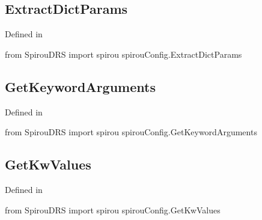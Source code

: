 \begin{minipage}{\textwidth}
\subsection{ExtractDictParams}

Defined in \spirou {}

\begin{pythonbox}
from SpirouDRS import spirou
spirouConfig.ExtractDictParams

\end{pythonbox}

\begin{pythondocstring}

\end{pythondocstring}
\end{minipage}

\begin{minipage}{\textwidth}
\subsection{GetKeywordArguments}

Defined in \spirou {}

\begin{pythonbox}
from SpirouDRS import spirou
spirouConfig.GetKeywordArguments

\end{pythonbox}

\begin{pythondocstring}

\end{pythondocstring}
\end{minipage}

\begin{minipage}{\textwidth}
\subsection{GetKwValues}

Defined in \spirou {}

\begin{pythonbox}
from SpirouDRS import spirou
spirouConfig.GetKwValues

\end{pythonbox}

\begin{pythondocstring}

\end{pythondocstring}
\end{minipage}

